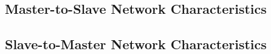 \documentclass[journal,comsoc]{IEEEtran}
\begin{document}
\subsection{Master-to-Slave Network Characteristics}

\subsection{Slave-to-Master Network Characteristics}


\ifCLASSOPTIONcaptionsoff
  \newpage
\fi





%
%
%



% 

\end{document}

